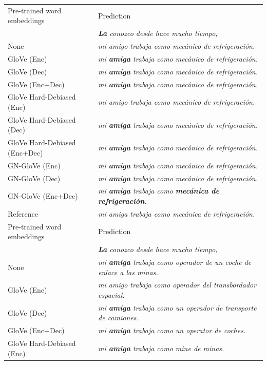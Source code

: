 \documentclass[11pt,a4paper]{article}
\begin{document}
\begin{table}[h!]
\centering
\begin{tabular}{ll}
\toprule
Pre-trained word embeddings & 
Prediction
\\
&
\textit{\textbf{La} conozco desde hace mucho tiempo,}
\\
\midrule
None & \textit{mi amigo trabaja como mecánico de refrigeración.}
\\
GloVe (Enc) & \textit{mi \textbf{amiga} trabaja como mecánico de refrigeración.} \\
GloVe (Dec) & \textit{mi \textbf{amiga} trabaja como mecánico de refrigeración.} \\
GloVe (Enc+Dec) & \textit{mi \textbf{amiga} trabaja como mecánico de refrigeración.} \\
GloVe Hard-Debiased (Enc) & \textit{mi amigo trabaja como mecánico de refrigeración.} \\
GloVe Hard-Debiased (Dec) & \textit{mi \textbf{amiga} trabaja como mecánico de refrigeración.} \\
GloVe Hard-Debiased (Enc+Dec) & \textit{mi \textbf{amiga} trabaja como mecánico de refrigeración.} \\
GN-GloVe (Enc) & \textit{mi \textbf{amiga} trabaja como mecánico de refrigeración.} \\
GN-GloVe (Dec) & \textit{mi \textbf{amiga} trabaja como mecánico de refrigeración.} \\
GN-GloVe (Enc+Dec) & \textit{mi \textbf{amiga} trabaja como \textbf{mecánica de refrigeración}.} \\
\midrule
Reference & \textit{mi amiga trabaja como mecánica de refrigeración.} \\
\bottomrule
\toprule
Pre-trained word embeddings & 
Prediction \\
& \textit{\textbf{La} conozco desde hace mucho tiempo,} \\
\midrule
None & \textit{mi \textbf{amiga} trabaja como operador de un coche de enlace a las minas.} \\
GloVe (Enc) & \textit{mi amigo trabaja como operador del transbordador espacial.} \\
GloVe (Dec) & \textit{mi \textbf{amiga} trabaja como un operador de transporte de camiones.} \\
GloVe (Enc+Dec) & \textit{mi \textbf{amiga} trabaja como un operator de coches.} \\
GloVe Hard-Debiased (Enc) & \textit{mi \textbf{amiga} trabaja como mine de minas.} \\

\end{tabular}
\end{table}
\end{document}
